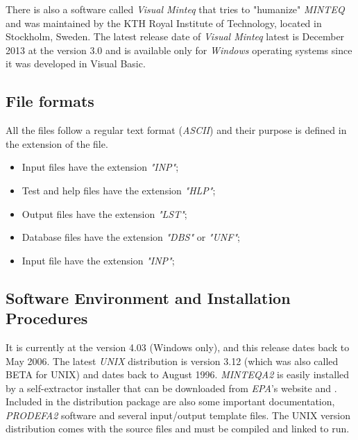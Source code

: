 There is also a software called \emph{Visual Minteq} that tries to "humanize" \emph{MINTEQ} and was maintained by the KTH Royal Institute of Technology, located in Stockholm, Sweden. The latest release date of \emph{Visual Minteq} latest is December 2013 at the version 3.0 and is available only for \emph{Windows} operating systems since it was developed in Visual Basic. 

\subsection{File formats}
All the files follow a regular text format (\emph{ASCII}) and their purpose is defined in the extension of the file. 
\begin{itemize}
\item Input files have the extension \emph{"INP"};
\item Test and help files have the extension \emph{"HLP"};
\item Output files have the extension \emph{"LST"};
\item Database files have the extension \emph{"DBS"} or \emph{"UNF"};
\item Input file have the extension \emph{"INP"};
\end{itemize}


\subsection{Software Environment and Installation Procedures}
It is currently at the version 4.03 (Windows only), and this release dates back to May 2006. The latest \emph{UNIX} distribution is version 3.12 (which was also called BETA for UNIX) and dates back to August 1996.
\emph{MINTEQA2} is easily installed by a self-extractor installer that can be downloaded from \emph{EPA}'s website \cite{minteq:website} and \cite{minteq:unix}. Included in the distribution package are also some important documentation, \emph{PRODEFA2} software and several input/output template files.
The UNIX version distribution comes with the source files and must be compiled and linked to run.


